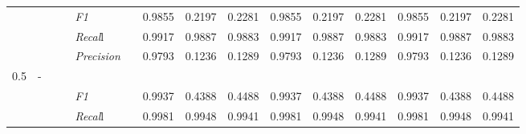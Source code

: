 \begin{table}[]
\begin{tabularx}{\textwidth}{XXlllllllllllll@{}}
                                                                    &                                                                     &                                                           &    & \textit{F1} &                                                      & 0.9855        & 0.2197        & 0.2281        & 0.9855        & 0.2197        & 0.2281        & 0.9855        & 0.2197        & 0.2281        \\
                                                                    &                                                                     &                                                           &    & \textit{Recal}l &                                                      & 0.9917    & 0.9887    & 0.9883    & 0.9917    & 0.9887    & 0.9883    & 0.9917    & 0.9887    & 0.9883    \\
                                                                    &                                                                     &                                                           &    & \textit{Precision} &                                                      & 0.9793 & 0.1236 & 0.1289 & 0.9793 & 0.1236 & 0.1289 & 0.9793 & 0.1236 & 0.1289 \\ \midrule
0.5 & - &  &  &                                                              &                                                                   &                                                             &                                                               &                                                                    &                                                              &                                                               &                                                                    &                                                              \\
                                                                    &                                                                     &                                                           &    & \textit{F1} &                                                      & 0.9937        & 0.4388        & 0.4488        & 0.9937        & 0.4388        & 0.4488        & 0.9937        & 0.4388        & 0.4488        \\
                                                                    &                                                                     &                                                           &    & \textit{Recal}l &                                                      & 0.9981    & 0.9948    & 0.9941    & 0.9981    & 0.9948    & 0.9941    & 0.9981    & 0.9948    & 0.9941    \\

\end{tabularx}
\end{table}
